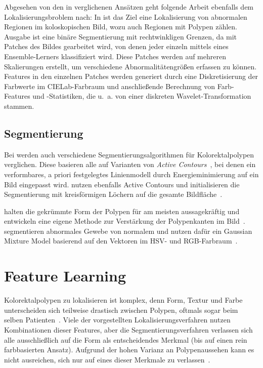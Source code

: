 Abgesehen von den in \cite{Prasath.2016} verglichenen Ansätzen geht folgende Arbeit ebenfalls dem Lokalisierungsbroblem nach:
In \cite{Li.2004} ist das Ziel eine Lokalisierung von abnormalen Regionen im koloskopischen Bild, wozu auch Regionen mit Polypen zählen.
Ausgabe ist eine binäre Segmentierung mit rechtwinkligen Grenzen, da mit Patches des Bildes gearbeitet wird, von denen jeder einzeln mittels eines Ensemble-Lerners klassifiziert wird.
Diese Patches werden auf mehreren Skalierungen erstellt, um verschiedene Abnormalitätengrößen erfassen zu können.
Features in den einzelnen Patches werden generiert durch eine Diskretisierung der Farbwerte im CIELab-Farbraum und anschließende Berechnung von Farb-Features und -Statistiken, die u.~a. von einer diskreten Wavelet-Transformation stammen.



\subsection{Segmentierung}

Bei \cite{Prasath.2016} werden auch verschiedene Segmentierungsalgorithmen für Kolorektalpolypen verglichen.
Diese basieren alle auf Varianten von \emph{Active Contours}~\cite{Kass.1988}, bei denen ein verformbares, a priori festgelegtes Linienmodell durch Energieminimierung auf ein Bild eingepasst wird.
\citeauthor{Sasmal.2018} nutzen ebenfalls Active Contours und initialisieren die Segmentierung mit kreisförmigen Löchern auf die gesamte Bildfläche~\cite{Sasmal.2018}.

\citeauthor{Ionescu.2013} halten die gekrümmte Form der Polypen für am meisten aussagekräftig und entwickeln eine eigene Methode zur Verstärkung der Polypenkanten im Bild~\cite{Ionescu.2013}.
\citeauthor{Vieira.2012} segmentieren abnormales Gewebe von normalem und nutzen dafür ein Gaussian Mixture Model basierend auf den Vektoren im HSV- und RGB-Farbraum~\cite{Vieira.2012}.




\section{Feature Learning}

Kolorektalpolypen zu lokalisieren ist komplex, denn Form, Textur und Farbe unterscheiden sich teilweise drastisch zwischen Polypen, oftmals sogar beim selben Patienten~\cite{Prasath.2016}.
Viele der vorgestellten Lokalisierungsverfahren nutzen Kombinationen dieser Features, aber die Segmentierungsverfahren verlassen sich alle ausschließlich auf die Form als entscheidendes Merkmal (bis auf einen rein farbbasierten Ansatz).
Aufgrund der hohen Varianz an Polypenaussehen kann es nicht ausreichen, sich nur auf eines dieser Merkmale zu verlassen~\cite{Prasath.2016}.

